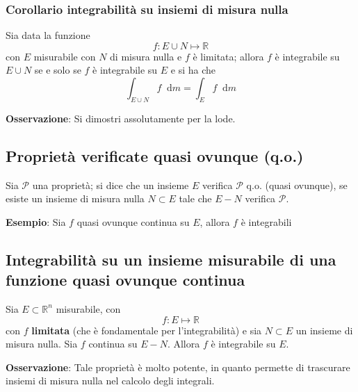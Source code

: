 \documentclass[a4paper]{extarticle}
\newcommand*\dif{\mathop{}\!\mathrm{d}}
\begin{document}
\vspace{2em}
\noindent
\subsubsection{Corollario integrabilità su insiemi di misura nulla}
Sia data la funzione
\[f : E \cup N \longmapsto \mathbb{R}\]
con $E$ misurabile con $N$ di misura nulla e $f$ è limitata; allora $f$ è integrabile su $E \cup N$ se e solo se $f$ è integrabile su $E$ e si ha che
\[\int_{E \cup N} f \dif m = \int_E f \dif m\]


\noindent
\textbf{Osservazione}: Si dimostri assolutamente per la lode.

\vspace{2em}
\noindent
\subsection{Proprietà verificate quasi ovunque (q.o.)}
Sia $\mathcal{P}$ una proprietà; si dice che un insieme $E$ verifica $\mathcal{P}$ q.o. (quasi ovunque), se esiste un insieme di misura nulla $N \subset E$ tale che $E-N$ verifica $\mathcal{P}$.

\vspace{1em}
\noindent
\textbf{Esempio}: Sia $f$ quasi ovunque continua su $E$, allora $f$ è integrabili

\vspace{2em}
\noindent
\subsection{Integrabilità su un insieme misurabile di una funzione quasi ovunque continua}
Sia $E \subset \mathbb{R}^n$ misurabile, con
\[f : E \longmapsto \mathbb{R}\]
con $f$ \textbf{limitata} (che è fondamentale per l'integrabilità) e sia $N \subset E$ un insieme di misura nulla. Sia $f$ continua su $E-N$. Allora $f$ è integrabile su $E$.

\vspace{1em}
\noindent
\textbf{Osservazione}: Tale proprietà è molto potente, in quanto permette di trascurare insiemi di misura nulla nel calcolo degli integrali.
\end{document}
